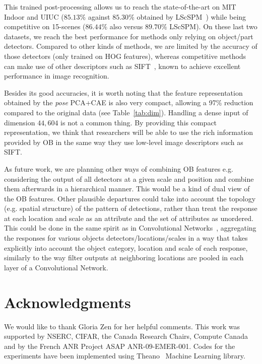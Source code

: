 \documentclass[runningheads,a4paper]{llncs}
\begin{document}
This trained post-processing allows us to reach the state-of-the-art on MIT
Indoor and UIUC ($85.13\%$ against $85.30\%$ obtained by LScSPM~\citep{Gao10})
while being competitive on 15-scenes ($86.44\%$ also versus $89.70\%$ LScSPM). 
%
On these last two datasets, we reach the best performance for methods only
relying on object/part detectors. Compared to other kinds of methods, we are
limited by the accuracy of those detectors (only trained on HOG features),
whereas competitive methods can make use of other descriptors such as
SIFT~\citep{Gao10}, known to achieve excellent performance in image recognition.


Besides its good accuracies, it is worth noting that the feature representation
obtained by the {\it pose} PCA+CAE is also very compact, allowing a 97\%
reduction compared to the original data (see Table~\ref{tab:dim}).  Handling a
dense input of dimension $44,604$ is not a common thing. By providing this
compact representation, we think that researchers will be able to use the rich
information provided by OB in the same way they use low-level image descriptors
such as SIFT.
 


As future work, we are planning other ways of combining OB features
e.g. considering the output of all detectors at a given scale and
position and combine them afterwards in a hierarchical manner.  This
would be a kind of dual view of the OB features. Other plausible
departures could take into account the topology (e.g. spatial
structure) of the pattern of detections, rather than treat the
response at each location and scale as an attribute and the set of
attributes as unordered. This could be done in the same spirit as in
Convolutional Networks~\citep{Lecun99objectrecognition}, aggregating
the responses for various objects detectors/locations/scales in a way
that takes explicitly into account the object category, location and
scale of each response, similarly to the way filter outputs at
neighboring locations are pooled in each layer of a Convolutional
Network.

\section{Acknowledgments} We would like to thank Gloria Zen for her helpful
comments.  This work was supported by NSERC, CIFAR, the Canada Research Chairs,
Compute Canada and by the French ANR Project ASAP ANR-09-EMER-001. Codes for
the experiments have been implemented using Theano~\citep{bergstra+al:2010-scipy} Machine Learning library.

%
%




\end{document}

